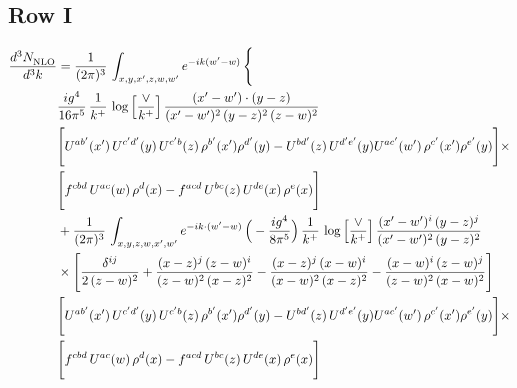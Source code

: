 \documentclass[9pt]{article}
\numberwithin{equation}{section}
\begin{document}
\subsection{Row I}
\begin{align}
     \frac{d^{3}N_{\rm NLO}^{\rm}}{d^{3}k}  & =  \frac{1}{(2\pi)^{3}}\, \int_{x,y,x',z,w,w^{\prime}} e^{-ik(w^{\prime}-w)}\, \Bigg\{\notag \\ & \frac{ig^{4}}{16\pi^{5}}\,\frac{1}{k^{+}}\,\log{\left[\frac{\vee}{k^{+}}\right]}\, \frac{(x'-w')\cdot (y-z)}{(x'-w')^{2}\,(y-z)^{2}\,(z-w)^{2}}\notag \\ &  \Bigg[U^{ab'}(x')\,U^{c'd'}(y)\,U^{c'b}(z)\,\rho^{b'}(x')\rho^{d'}(y)-U^{bd'}(z)\,U^{d'e'}(y)U^{ac'}(w')\,\rho^{c'}(x')\rho^{e'}(y)\Bigg]\times\notag \\ & \Bigg[f^{cbd}\,U^{ac}(w)\,\rho^{d}(x)-f^{acd}\, U^{bc}(z)\,U^{de}(x)\,\rho^{e}(x)\Bigg] 
\notag \\ & +\frac{1}{(2\pi)^{3}}\,\int_{x,y,z,w,x',w'}e^{-ik\cdot (w^\prime-w)}\,\Big(-\frac{ig^{4}}{8\pi^{5}}\Big)\,\frac{1}{k^{+}}\,\log{\left[\frac{\vee}{k^{+}}\right]}\,\frac{(x'-w')^{i}\,(y-z)^{j}}{(x'-w')^{2}\,(y-z)^{2}}\notag \\ & \times \Bigg[\frac{\delta^{ij}}{2\,(z-w)^{2}}+\frac{(x-z)^{j}\,(z-w)^{i}}{(z-w)^{2}\,(x-z)^{2}}-\frac{(x-z)^{j}\,(x-w)^{i}}{(x-w)^{2}\,(x-z)^{2}}-\frac{(x-w)^{i}\,(z-w)^{j}}{(z-w)^{2}\,(x-w)^{2}}\Bigg]\notag \\ & \Bigg[U^{ab'}(x')\,U^{c'd'}(y)\,U^{c'b}(z)\,\rho^{b'}(x')\rho^{d'}(y)-U^{bd'}(z)\,U^{d'e'}(y)U^{ac'}(w')\,\rho^{c'}(x')\rho^{e'}(y)\Bigg]\times\notag \\ & \Bigg[f^{cbd}\,U^{ac}(w)\,\rho^{d}(x)-f^{acd}\, U^{bc}(z)\,U^{de}(x)\,\rho^{e}(x)\Bigg]
\end{align}
\end{document}
